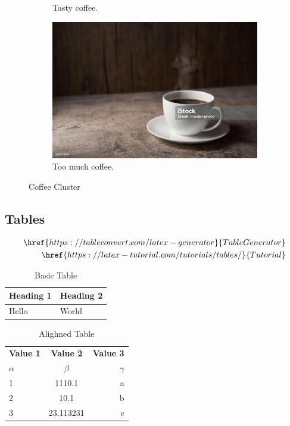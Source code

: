 \documentclass{article}[a4paper,12pt]
\begin{document}
\begin{figure}[h!]
\begin{subfigure}[b]{0.2\linewidth}
    \caption{Tasty coffee.}
  \end{subfigure}
  \begin{subfigure}[b]{0.5\linewidth}
    \includegraphics[width=\linewidth]{coffee.jpg}
    \caption{Too much coffee.}
  \end{subfigure}
  \caption{Coffee Cluster}
  \label{fig:coffee3}
\end{figure}

\subsection{Tables}

\begin{align*}
  \href{https://tableconvert.com/latex-generator}{Table Generator}\\
  \href{https://latex-tutorial.com/tutorials/tables/}{Tutorial}
\end{align*}

\begin{table}[!ht]
  \centering
  \caption{Basic Table}
  \begin{tabular}{|l|l|}
  \hline
      \textbf{Heading 1} & \textbf{Heading 2} \\ \hline
      Hello & World \\ \hline
  \end{tabular}
  \label{tab:basic}
\end{table}

\begin{table}[h!]
  \begin{center}
    \caption{Alighned Table}
    \label{tab:alighned}
    \begin{tabular}{l|c|r} %
      \textbf{Value 1} & \textbf{Value 2} & \textbf{Value 3}\\
      $\alpha$ & $\beta$ & $\gamma$ \\
      \hline
      1 & 1110.1 & a\\
      2 & 10.1 & b\\
      3 & 23.113231 & c\\
    \end{tabular}
  \end{center}
\end{table}
\end{document}
